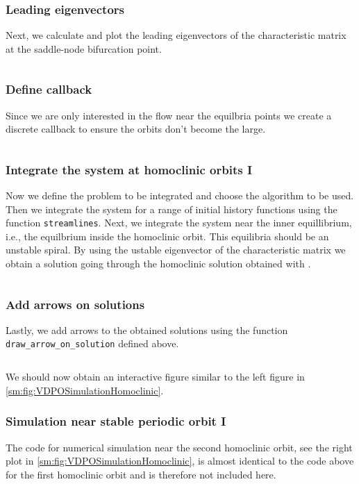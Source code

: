 \subsubsection{Leading eigenvectors}
Next, we calculate and plot the leading eigenvectors of the characteristic matrix at the saddle-node bifurcation point.
\inputminted[firstline=103, lastline=117]{julia}{\pathToJuliaFiles/vdpo_simulation_article.jl}

\subsubsection{Define callback}
Since we are only interested in the flow near the equilbria points we create a
discrete callback to ensure the orbits don't become the large.
\inputminted[firstline=122, lastline=125]{julia}{\pathToJuliaFiles/vdpo_simulation_article.jl}

\subsubsection{Integrate the system at homoclinic orbits I}
Now we define the problem to be integrated and choose the algorithm to be used.
Then we integrate the system for a range of initial history functions using the
function \texttt{streamlines}. Next, we integrate the system near
the inner equillibrium, i.e., the equilbrium inside the homoclinic orbit. This
equilibria should be an unstable spiral. By using the ustable eigenvector of the
characteristic matrix we obtain a solution going through the homoclinic solution
obtained with \DDEBIFTOOL.
\inputminted[firstline=127, lastline=152]{julia}{\pathToJuliaFiles/vdpo_simulation_article.jl}

\subsubsection{Add arrows on solutions}
Lastly, we add arrows to the obtained solutions using the function
\texttt{draw_arrow_on_solution} defined above.
\inputminted[firstline=154, lastline=158]{julia}{\pathToJuliaFiles/vdpo_simulation_article.jl}
We should now obtain an interactive figure similar to the left figure in \cref{sm:fig:VDPOSimulationHomoclinic}.

\subsubsection{Simulation near stable periodic orbit I}
The code for numerical simulation near the second homoclinic orbit, see the
right plot in \cref{sm:fig:VDPOSimulationHomoclinic}, is almost identical to
the code above for the first homoclinic orbit and is therefore not included
here.

